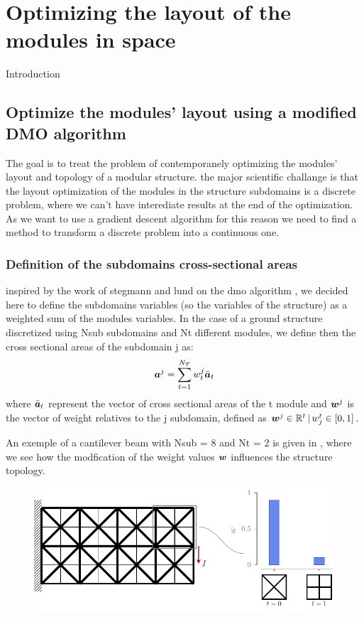 \setchapterpreamble[u]{\margintoc}
\glsresetall %
\chapter{Optimizing the layout of the modules in space}
Introduction

\section{Optimize the modules' layout using a modified DMO algorithm}
The goal is to treat the problem of contemporanely optimizing the modules' layout and topology of a modular structure. the major scientific challange is that the layout optimization of the modules in the structure subdomains is a discrete problem, where we can't have interediate results at the end of the optimization. As we want to use a gradient descent algorithm  for this reason we need to find a method to transform a discrete problem into a continuous one. 

\subsection{Definition of the subdomains cross-sectional areas}
inspired by the work of stegmann and lund on the \gls{dmo} algorithm , we decided here to define the subdomains variables (so the variables of the structure) as a weighted sum of the modules variables. In the case of a ground structure discretized using Nsub subdomains and Nt different modules, we define then the cross sectional areas of the subdomain j as:
\begin{equation}
    \bm{a}^j = \sum_{t=1}^{N_T} w_t^j \bar{\bm{a}}_t 
\end{equation}
where $\bar{\bm{a}}_t $ represent the vector of cross sectional areas of the t module and $\bm{w}^j$ is the vector of weight relatives to the j subdomain, defined as $ \bm{w}^j \in \mathbb{R}^t\,|\,w_j^t \in [0,1]$.

An exemple of a cantilever beam with Nsub = 8 and Nt = 2 is given in , where we see how the modfication of the weight values $\bm{w}$ influences the structure topology.

\begin{figure}
    \centering
    \includegraphics{figures/06_DMO/00_weight_dmo/weight_dmo.pdf}
    \caption{}
    \label{fig:06_weighted_sum}
\end{figure}

